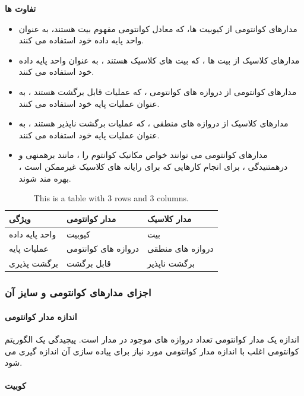 \documentclass{book}
\begin{document}
\textbf{تفاوت ها}

\begin{itemize}
	\item مدارهای کوانتومی از کیوبیت ها، که معادل کوانتومی مفهوم بیت هستند، به عنوان واحد پایه داده خود استفاده می کنند. 
	\item مدارهای کلاسیک از بیت ها ، که بیت های کلاسیک هستند ، به عنوان واحد پایه داده خود استفاده می کنند.
	\item مدارهای کوانتومی از دروازه های کوانتومی ، که عملیات قابل برگشت هستند ، به عنوان عملیات پایه خود استفاده می کنند.
	\item  مدارهای کلاسیک از دروازه های منطقی ، که عملیات برگشت ناپذیر هستند ، به عنوان عملیات پایه خود استفاده می کنند.
	\item مدارهای کوانتومی می توانند خواص مکانیک کوانتوم را ، مانند برهمنهی و درهمتنیدگی ، برای انجام کارهایی که برای رایانه های کلاسیک غیرممکن است ، بهره مند شوند.
\end{itemize}



\begin{table}[ht]
	\centering
	\begin{tabular}{|p{100pt}|p{100pt}|p{100pt}|}
		\hline
		ویژگی & مدار کوانتومی &مدار کلاسیک \\
		\hline
		واحد پایه داده & کیوبیت & بیت \\
		\hline
	      عملیات پایه & دروازه های کوانتومی & دروازه های منطقی \\
		\hline
		برگشت پذیری & قابل برگشت & برگشت ناپذیر \\
		\hline
	\end{tabular}
	\caption{This is a table with 3 rows and 3 columns.}
\end{table}



\subsubsection{اجزای مدار‌های کوانتومی و سایز آن }
\paragraph{اندازه مدار کوانتومی}

اندازه یک مدار کوانتومی تعداد دروازه های موجود در مدار است. پیچیدگی یک الگوریتم کوانتومی اغلب با اندازه مدار کوانتومی مورد نیاز برای پیاده سازی آن اندازه گیری می شود.


\paragraph{کوبیت}
\end{document}
